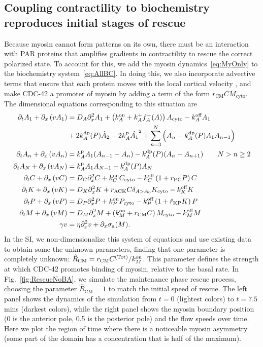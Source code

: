 \documentclass[11pt]{article}
\newcommand{\6}[1]{#1_{\text{6}}}
\newcommand{\3}[1]{#1_{\text{3}}}
\newcommand{\Tot}[1]{#1^\text{(Tot)}}
\newcommand{\My}[1]{#1_M}
\begin{document}
\subsection{Coupling contractility to biochemistry reproduces initial stages of rescue \label{sec:WithMy}}
Because myosin cannot form patterns on its own, there must be an interaction with PAR proteins that amplifies gradients in contractility to rescue the correct polarized state. To account for this, we add the myosin dynamics\ \eqref{eq:MyOnly} to the biochemistry system\ \eqref{eq:AllBC}. In doing this, we also incorporate advective terms that ensure that each protein moves with the local cortical velocity \cite{illukkumbura2023design}, and make CDC-42 a promoter of myosin by adding a term of the form $r_\text{CM}C M_\text{cyto}$. The dimensional equations corresponding to this situation are
\begin{subequations}
\label{eq:Everything}
\begin{align}
\label{eq:P31}
\Dt \MA + \Dx \left( v \MA \right)& = D_A \Dx^2 \MA + \left(\kon_A+k^+_A f^+_A(A) \right)A_\text{cyto}- \koff_A \MA  \\  \nonumber
 &+ 2 \kdp_A(P) \hat{A}_2-2\kp_A \hat{\MA}^2+\sum_{n=3}^N \left(A_n-\kdp_A(P) A_1 A_{n-1}\right)  \\ 
\Dt \PA + \Dx \left(v \PA \right)& =\kp_{A}\MA (A_{n-1}-A_n) -\kdp_A(P)(A_n-A_{n+1})  \qquad N > n \geq 2 \\ 
\label{eq:P33}
\Dt A_N + \Dx \left(v A_N\right)& =\kp_A \MA  A_{N-1}-\kdp_A(P) A_N \\
\label{eq:Ceqn}
\Dt C + \Dx \left(v C\right)& =D_C \Dx^2 {C} +\kon_C C_\text{cyto}  - \koff_C \left(1+r_\text{PC}P\right)C\\
\label{eq:Keqn}
\Dt {K} + \Dx \left(v K\right) &= D_K \Dx^2 {K} + {r}_\text{ACK} {C} \delta_{A > A_0}K_\text{cyto}-\koff_K K \\
\Dt {P} + \Dx \left(v P \right)& =D_P \Dx^2 {P} +\kon_P P_\text{cyto}  - \koff_P \left(1+\hat{r}_\text{KP}{K}\right){P}\\
\Dt M + \Dx \left(v M\right) &= D_M \Dx^2 M +\left(\My{\kon}+r_\text{CM} C\right) M_\text{cyto} - \My{\koff} M \\
\label{eq:veleqndim}
\gamma v &= \eta \Dx^2 v + \Dx \sigma_a(M).
\end{align}
\end{subequations}
In the SI, we non-dimensionalize this system of equations and use existing data to obtain some the unknown parameters, finding that one parameter is completely unknown: $\hat R_\text{CM}=r_\text{CM} \Tot{C}/\kon_M$. This parameter defines the strength at which CDC-42 promotes binding of myosin, relative to the basal rate. In Fig.\ \ref{fig:RescueNoBA}, we simulate the maintenance phase rescue process, choosing the parameter $\hat R_\text{CM}=1$ to match the initial speed of rescue. The left panel shows the dynamics of the simulation from $t=0$ (lightest colors) to $t=7.5$ mins (darkest colors), while the right panel shows the myosin boundary position (0 is the anterior pole, 0.5 is the posterior pole) and the flow speeds over time. Here we plot the region of time where there is a noticeable myosin asymmetry (some part of the domain has a concentration that is half of the maximum).
\end{document}
